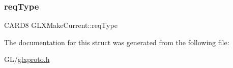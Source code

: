 \mbox{\label{struct_g_l_x_make_current_a8f947b2a1f3d666a669bfbf309ab3d2a}} 
\subsubsection{\texorpdfstring{req\+Type}{reqType}}
{\footnotesize\ttfamily C\+A\+R\+D8 G\+L\+X\+Make\+Current\+::req\+Type}



The documentation for this struct was generated from the following file\+:\begin{DoxyCompactItemize}
\item 
G\+L/\hyperlink{glxproto_8h}{glxproto.\+h}\end{DoxyCompactItemize}
